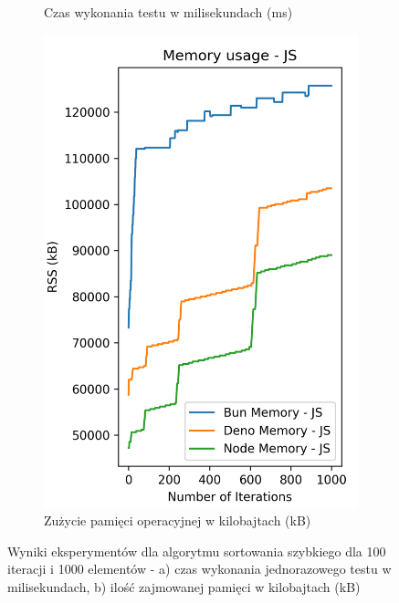 \begin{figure}[H]
\begin{subfigure}[b]{0.42\textwidth}
    \caption{Czas wykonania testu w milisekundach (ms)}
    \label{fig:quick_sorting_e2_time}
  \end{subfigure}
  \begin{subfigure}[b]{0.42\textwidth}
    \centering
    \includegraphics[width=\textwidth]{Figures/sorting/sorting_quick_1000_1000_js_memory.png}
    \caption{Zużycie pamięci operacyjnej w kilobajtach (kB)}
    \label{fig:quick_sorting_e2_memory}
  \end{subfigure}
  \caption{Wyniki eksperymentów dla algorytmu sortowania szybkiego dla 100 iteracji i 1000 elementów - a) czas wykonania jednorazowego testu w milisekundach, b) ilość zajmowanej pamięci w kilobajtach (kB)}
  \label{fig:quick_sorting_e2}
\end{figure}

